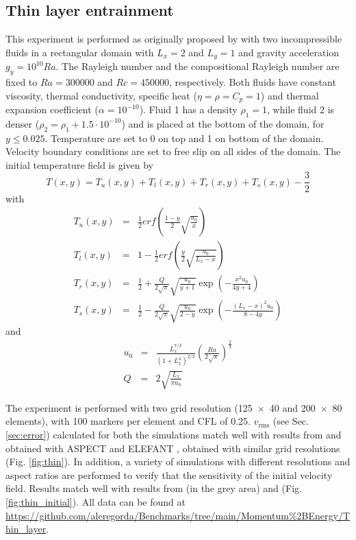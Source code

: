 \documentclass[hidelinks,10pt,a4paper]{article}
\begin{document}
\subsection{Thin layer entrainment}\label{sec:thin}
This experiment is performed as originally proposed by \citet{vanKeken1997} with two incompressible fluids in a rectangular domain with $L_x=2$ and $L_y=1$
and gravity acceleration $g_y=10^{10}Ra$. The Rayleigh number and the compositional Rayleigh number are fixed to $Ra=300000$ and $Rc=450000$, respectively.
Both fluids have constant viscosity, thermal conductivity, specific heat ($\eta=\rho=C_p=1$) and thermal expansion coefficient ($\alpha=10^{-10}$). Fluid 1
has a density $\rho_1=1$, while fluid 2 is denser ($\rho_2=\rho_1+1.5 \cdot 10^{-10}$) and is placed at the bottom of the domain, for $y \leq 0.025$.
Temperature are set to 0 on top and 1 on bottom of the domain. Velocity boundary conditions are set to free slip on all sides of the domain. The initial
temperature field is given by
\[T(x,y)=T_u(x,y)+T_l(x,y)+T_r(x,y)+T_s(x,y)-\frac{3}{2}\]
with
\begin{eqnarray}
T_u(x,y)&=&\frac{1}{2}erf\left(\frac{1-y}{2}\sqrt{\frac{u_0}{x}}\right)\nonumber \\
T_l(x,y)&=&1-\frac{1}{2}erf\left(\frac{y}{2}\sqrt{\frac{u_0}{L_x-x}}\right)\nonumber \\
T_r(x,y)&=&\frac{1}{2}+\frac{Q}{2\sqrt{\pi}}\sqrt{\frac{u_0}{y+1}} \exp\left(-\frac{x^2u_0}{4y+4}\right)\nonumber \\
T_s(x,y)&=&\frac{1}{2}-\frac{Q}{2\sqrt{\pi}}\sqrt{\frac{u_0}{2-y}} \exp\left(-\frac{(L_x-x)^2u_0}{8-4y}\right)\nonumber
\end{eqnarray}
and
\begin{eqnarray}
u_0&=&\frac{L_x^{7/3}}{(1+L_x^4)^{2/3}}\left(\frac{Ra}{2\sqrt{\pi}}\right)^{\frac{2}{3}}\nonumber \\
Q&=&2\sqrt{\frac{L_x}{\pi u_0}}\nonumber
\end{eqnarray}

The experiment is performed with two grid resolution (\num{125x40} and \num{200x80} elements), with 100 markers per element and CFL of 0.25. $v_{\textrm{rms}}$
(see Sec. \ref{sec:error}) calculated for both the simulations match well with results from \citet{vanKeken1997} and obtained with ASPECT
\citep{Kronbichler2012,Heister2017,Bangerth2020,Bangerth2020a} and ELEFANT \citep{Thieulot2014}, obtained with similar grid resolutions
(Fig. \ref{fig:thin}). In addition, a variety of simulations with different resolutions and aspect ratios are performed to verify that the sensitivity of the
initial velocity field. Results match well with results from \citet{vanKeken1997} (in the grey area) and \citet{Thieulot2014} (Fig. \ref{fig:thin_initial}). 
All data can be found at \url{https://github.com/aleregorda/Benchmarks/tree/main/Momentum%2BEnergy/Thin_layer}.
\end{document}
